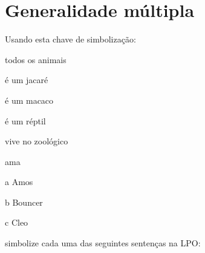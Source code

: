 \chapter{Generalidade múltipla}\setcounter{ProbPart}{0}
\problempart
Usando esta chave de simbolização:
\begin{ekey}
\item[\text{domínio}] todos os animais
\item[\atom{A}{x}]  é um jacaré
\item[\atom{M}{x}]  é um macaco
\item[\atom{R}{x}]  é um réptil
\item[\atom{Z}{x}]  vive no zoológico
\item[\atom{L}{x,y}]  ama 
\item[a] Amos
\item[b] Bouncer
\item[c] Cleo
\end{ekey}
simbolize cada uma das seguintes sentenças na LPO:
